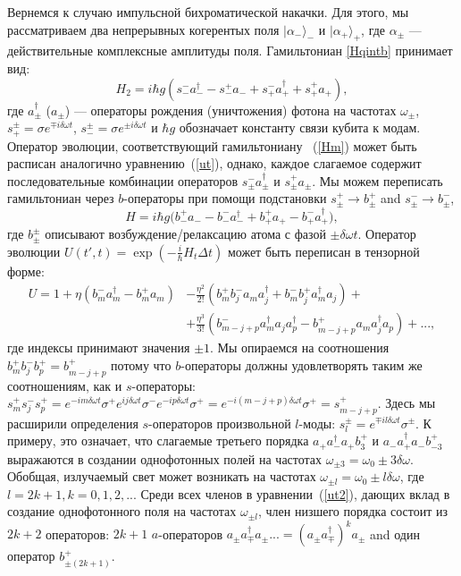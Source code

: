 Вернемся к случаю импульсной бихроматической накачки. Для этого, мы рассматриваем два непрерывных когерентых поля $|\alpha_{-}\rangle_-$ и $|\alpha_{+}\rangle_+$, где $\alpha_{\pm}$ --- действительные комплексные амплитуды поля. Гамильтониан \eqref{Hqintb} принимает вид:
\begin{equation}
	H_{2} = i\hbar g(s_-^-a^\dag_{-} - s_-^+ a_{-}  + s_+^- a^\dag_{+} + s_+^+ a_{+} ) ,
	\label{Hm}
\end{equation}
где $a^\dag_\pm$ ($a_\pm$) --- операторы рождения (уничтожения) фотона на частотах $\omega_\pm$, $s_+^\pm = \sigma e^{\mp i\delta\omega t}$, $s_-^\pm = \sigma e^{\pm i\delta\omega t}$ и $\hbar g$ обозначает константу связи кубита к модам. Оператор эволюции, соответствующий гамильтониану ~(\ref{Hm}) может быть расписан аналогично уравнению~(\ref{ut}), однако, каждое слагаемое содержит последовательные комбинации операторов $s_\pm^- a^\dag_{\pm}$ и $s_\pm^+ a_{\pm}$. Мы можем переписать гамильтониан через $b$-операторы при помощи подстановки $s_\pm^+ \rightarrow b_\pm^+$ and $s_\pm^- \rightarrow b_\pm^-$,  
\begin{equation}
	H = i \hbar g\big(b_-^+ a_{-}  - b_-^-a^\dag_{-} + b_+^+ a_{+} - b^-_+ a^\dag_{+} \big),
	\label{Hmb}
\end{equation}
где $b_\pm^\pm$ описывают возбуждение/релаксацию атома с фазой $\pm\delta\omega t$. Оператор эволюции $U(t',t) = \exp(-\frac{i}{\hbar} H_{t}\Delta t)$ может быть переписан в тензорной форме:  
\begin{equation}
	\begin{split}
		U =1 + \eta (b^-_m a^\dag_m - b^+_m a_m)  &- \frac{\eta^2}{2!}(b^+_m b^-_j a_m a^\dag_j + b^-_m b^+_j a_m^{\dag} a_j) + \\
		&+ \frac{\eta^3}{3!} (b^-_{m-j+p} a^\dag_m a_j a^\dag_p - b^+_{m-j+p} a_m a_j^{\dag} a_p) +...,
	\end{split}
	\label{ut2}
\end{equation}
где индексы принимают значения $\pm 1$. Мы опираемся на соотношения $b^+_m b^-_j b^+_p = b^+_{m-j+p}$ потому что $b$-операторы должны удовлетворять таким же соотношениям, как и $s$-операторы: $s_m^+ s_j^- s_p^+ = e^{-i m\delta\omega t}\sigma^+ e^{i j\delta\omega t}\sigma^- e^{-i p\delta\omega t}\sigma^+ = e^{-i (m-j+p)\delta\omega t}\sigma^+ = s_{m-j+p}^+$. Здесь мы расширили определения  $s$-операторов произвольной $l$-моды: $s_l^\pm = e^{\mp i l\delta\omega t} \sigma^\pm$. К примеру, это означает, что слагаемые третьего порядка $a_+ a^\dag_- a_+ b^+_3$ и $a_- a^\dag_+ a_- b^+_{-3}$ выражаются в создании однофотонных полей на частотах $\omega_{\pm 3} = \omega_0 \pm 3\delta\omega$. Обобщая, излучаемый свет может возникать на частотах $\omega_{\pm l}=\omega_0 \pm l\delta\omega$, где $l=2k+1,k = 0,1,2,..$. Среди всех членов в уравнении~(\ref{ut2}), дающих вклад в создание однофотонного поля на частотах $\omega_{\pm l}$, член низшего порядка состоит из $2k+2$ операторов: $2k+1$ $a$-операторов $a_\pm a^\dag_\mp a_\pm ... = (a_\pm a^\dag_\mp)^k a_\pm$ and один оператор $b_{\pm (2k+1)}^+$. 
